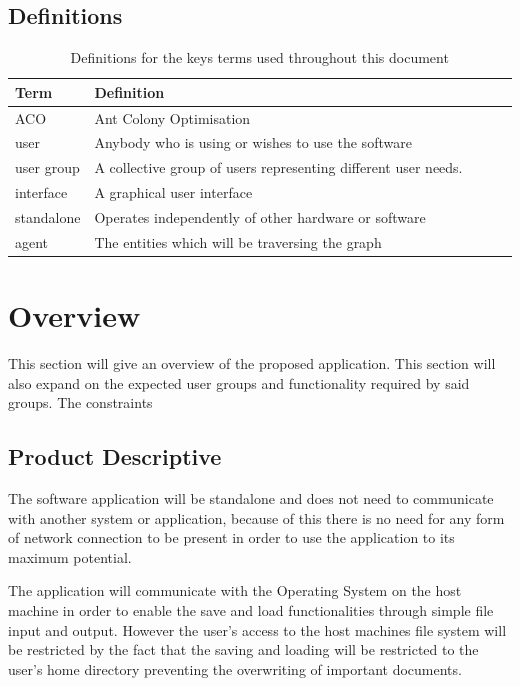\subsection{Definitions}

\begin{table}[h]
\centering
\begin{tabular}{|l|l|lll}
\textbf{Term} & \textbf{Definition}                                            \\ 
\hline
ACO           & Ant Colony Optimisation                              \\ 
user          & Anybody who is using or wishes to use the software      \\ 
user group    & A collective group of users representing different user needs. \\ 
interface       &A graphical user interface \\
standalone    &Operates independently of other hardware or software\\
agent		&The entities which will be traversing the graph \\
\end{tabular}
\caption{Definitions for the keys terms used throughout this document}
\end{table}

\section{Overview}

This section will give an overview of the proposed application. This section will also expand on the expected user groups and functionality required by said groups. The constraints 

\subsection{Product Descriptive}

The software application will be standalone and does not need to communicate with another system or application, because of this there is no need for any form of network connection to be present in order to use the application to its maximum potential.

The application will communicate with the Operating System on the host machine in order to enable the save and load functionalities through simple file input and output. However the user’s access to the host machines file system will be restricted by the fact that the saving and loading will be restricted to the user’s home directory preventing the overwriting of important documents.

